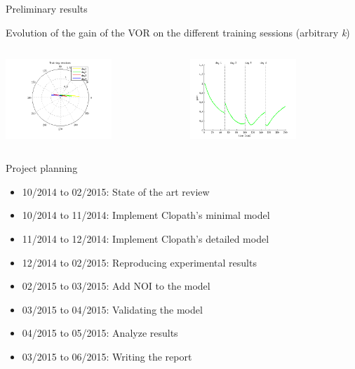 \documentclass[ignorenonframetext,]{beamer}
\begin{document}
\begin{frame}{Preliminary results}

Evolution of the gain of the VOR on the different training sessions
(arbitrary \emph{k})

\begin{columns}[T]
\begin{column}[T]{5cm}
\includegraphics[height=3cm]{images/report_11.png}
\end{column}
\begin{column}[T]{5cm}
\includegraphics[height=3cm]{images/report_14.png}
\end{column}
\end{columns}

\end{frame}

\begin{frame}{Project planning}

\begin{itemize}
\itemsep1pt\parskip0pt
\item
  10/2014 to 02/2015: State of the art review
\item
  10/2014 to 11/2014: Implement Clopath's minimal model
\item
  11/2014 to 12/2014: Implement Clopath's detailed model
\item
  12/2014 to 02/2015: Reproducing experimental results
\item
  02/2015 to 03/2015: Add NOI to the model
\item
  03/2015 to 04/2015: Validating the model
\item
  04/2015 to 05/2015: Analyze results
\item
  03/2015 to 06/2015: Writing the report
\end{itemize}

\end{frame}
\end{document}
